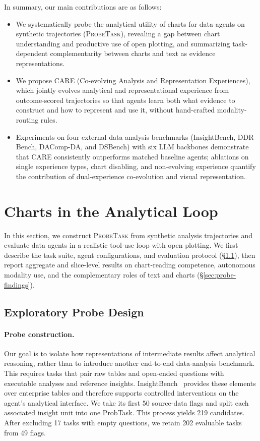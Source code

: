 \documentclass{article}
\newcommand{\probe}{\textsc{ProbeTask}}
\begin{document}
In summary, our main contributions are as follows:
\begin{itemize}
  \item We systematically probe the analytical utility of charts for data agents on synthetic trajectories (\probe{}), revealing a gap between chart understanding and productive use of open plotting, and summarizing task-dependent complementarity between charts and text as evidence representations.
  \item We propose \textsc{CARE} (Co-evolving Analysis and Representation Experiences), which jointly evolves analytical and representational experience from outcome-scored trajectories so that agents learn both what evidence to construct and how to represent and use it, without hand-crafted modality-routing rules.
  \item Experiments on four external data-analysis benchmarks (InsightBench, DDR-Bench, DAComp-DA, and DSBench) with six LLM backbones demonstrate that \textsc{CARE} consistently outperforms matched baseline agents; ablations on single experience types, chart disabling, and non-evolving experience quantify the contribution of dual-experience co-evolution and visual representation.
\end{itemize}



\section{Charts in the Analytical Loop}
\label{sec:probe}

In this section, we construct \probe{} from synthetic analysis trajectories and evaluate data agents in a realistic tool-use loop with open plotting.
We first describe the task suite, agent configurations, and evaluation protocol (\S\ref{sec:probe-setup}), then report aggregate and slice-level results on chart-reading competence, autonomous modality use, and the complementary roles of text and charts (\S\ref{sec:probe-findings}).

\subsection{Exploratory Probe Design}
\label{sec:probe-setup}

\paragraph{Probe construction.}
Our goal is to isolate how representations of intermediate results affect analytical reasoning, rather than to introduce another end-to-end data-analysis benchmark.
This requires tasks that pair raw tables and open-ended questions with executable analyses and reference insights.
InsightBench~\citep{sahu2025insightbench} provides these elements over enterprise tables and therefore supports controlled interventions on the agent's analytical interface.
We take its first 50 source-data flags and split each associated insight unit into one ProbTask.
This process yields 219 candidates.
After excluding 17 tasks with empty questions, we retain 202 evaluable tasks from 49 flags.
\end{document}
